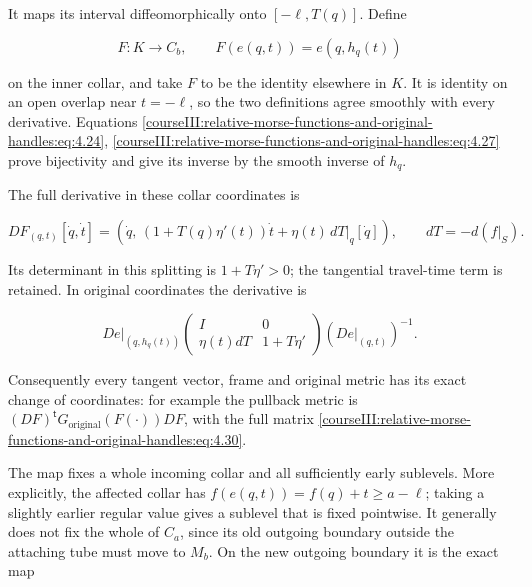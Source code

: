 It maps its interval diffeomorphically onto \([-\ell,T(q)]\). Define

\begin{equation}
F:K\longrightarrow C_b,\qquad
F(e(q,t))=e(q,h_q(t))
\label{courseIII:relative-morse-functions-and-original-handles:eq:4.28}
\end{equation}

on the inner collar, and take \(F\) to be the identity elsewhere in \(K\). It is identity on an open overlap near \(t=-\ell\), so the two definitions agree smoothly with every derivative. Equations \eqref{courseIII:relative-morse-functions-and-original-handles:eq:4.24}, \eqref{courseIII:relative-morse-functions-and-original-handles:eq:4.27} prove bijectivity and give its inverse by the smooth inverse of \(h_q\).

The full derivative in these collar coordinates is

\begin{equation}
DF_{(q,t)}[\dot q,\dot t]
=\left(\dot q,\,
 (1+T(q)\eta'(t))\dot t+\eta(t)\,dT|_q[\dot q]\right),
\qquad dT=-d(f|_S).
\label{courseIII:relative-morse-functions-and-original-handles:eq:4.29}
\end{equation}

Its determinant in this splitting is \(1+T\eta'>0\); the tangential travel-time term is retained. In original coordinates the derivative is

\begin{equation}
De|_{(q,h_q(t))}
\begin{pmatrix}I&0\\ \eta(t)dT&1+T\eta'\end{pmatrix}
(De|_{(q,t)})^{-1}.
\label{courseIII:relative-morse-functions-and-original-handles:eq:4.30}
\end{equation}

Consequently every tangent vector, frame and original metric has its exact change of coordinates: for example the pullback metric is \((DF)^{\mathsf t}G_{\mathrm{original}}(F(\cdot))DF\), with the full matrix \eqref{courseIII:relative-morse-functions-and-original-handles:eq:4.30}.

The map fixes a whole incoming collar and all sufficiently early sublevels. More explicitly, the affected collar has \(f(e(q,t))=f(q)+t\geq a-\ell\); taking a slightly earlier regular value gives a sublevel that is fixed pointwise. It generally does not fix the whole of \(C_a\), since its old outgoing boundary outside the attaching tube must move to \(M_b\). On the new outgoing boundary it is the exact map

